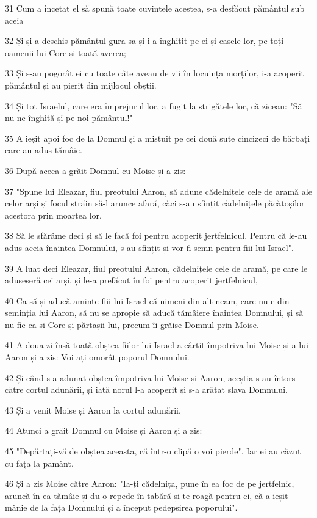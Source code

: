 \par 31 Cum a încetat el să spună toate cuvintele acestea, s-a desfăcut pământul sub aceia
\par 32 Și și-a deschis pământul gura sa și i-a înghițit pe ei și casele lor, pe toți oamenii lui Core și toată averea;
\par 33 Și s-au pogorât ei cu toate câte aveau de vii în locuința morților, i-a acoperit pământul și au pierit din mijlocul obștii.
\par 34 Și tot Israelul, care era împrejurul lor, a fugit la strigătele lor, că ziceau: "Să nu ne înghită și pe noi pământul!"
\par 35 A ieșit apoi foc de la Domnul și a mistuit pe cei două sute cincizeci de bărbați care au adus tămâie.
\par 36 După aceea a grăit Domnul cu Moise și a zis:
\par 37 "Spune lui Eleazar, fiul preotului Aaron, să adune cădelnițele cele de aramă ale celor arși și focul străin să-l arunce afară, căci s-au sfințit cădelnițele păcătoșilor acestora prin moartea lor.
\par 38 Să le sfărâme deci și să le facă foi pentru acoperit jertfelnicul. Pentru că le-au adus aceia înaintea Domnului, s-au sfințit și vor fi semn pentru fiii lui Israel".
\par 39 A luat deci Eleazar, fiul preotului Aaron, cădelnițele cele de aramă, pe care le aduseseră cei arși, și le-a prefăcut în foi pentru acoperit jertfelnicul,
\par 40 Ca să-și aducă aminte fiii lui Israel că nimeni din alt neam, care nu e din seminția lui Aaron, să nu se apropie să aducă tămâiere înaintea Domnului, și să nu fie ca și Core și părtașii lui, precum îi grăise Domnul prin Moise.
\par 41 A doua zi însă toată obștea fiilor lui Israel a cârtit împotriva lui Moise și a lui Aaron și a zis: Voi ați omorât poporul Domnului.
\par 42 Și când s-a adunat obștea împotriva lui Moise și Aaron, aceștia s-au întors către cortul adunării, și iată norul l-a acoperit și s-a arătat slava Domnului.
\par 43 Și a venit Moise și Aaron la cortul adunării.
\par 44 Atunci a grăit Domnul cu Moise și Aaron și a zis:
\par 45 "Depărtați-vă de obștea aceasta, că într-o clipă o voi pierde". Iar ei au căzut cu fața la pământ.
\par 46 Și a zis Moise către Aaron: "Ia-ți cădelnița, pune în ea foc de pe jertfelnic, aruncă în ea tămâie și du-o repede în tabără și te roagă pentru ei, că a ieșit mânie de la fața Domnului și a început pedepsirea poporului".
